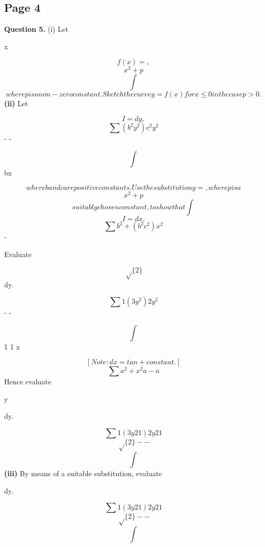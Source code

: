\documentclass[12pt]{article}
\begin{document}
\subsection*{Page 4}
\begin{flushleft}
\bigskip\textbf{Question 5.} (i) Let\par
x\par
\[f(x) = ,\]
\[x^2 + p\]
\[\int\]
\[where p is a non-zero constant. Sketch the curve y = f(x) for x \leq 0 in the case p > 0.\]
\textbf{(ii)} Let\par
\[I = dy,\]
\[\sum (b^2 y^2) c^2 y^2\]
- -\par
\[\int\]
bx\par
\[where b and c are positive constants. Use the substitution y = , where p is a\]
\[x^2 + p\]
\[suitably chosen constant, to show that \int\]
\[I = dx.\]
\[\sum b^2 + (b^2 c^2)x^2\]
-\par
Evaluate\par
\[\sqrt\{2\}\]
dy.\par
\[\sum1 (3 y^2) 2 y^2\]
- -\par
\[\int\]
1 1 x\par
\[[ Note: dx = tan + constant.]\]
\[\sum a^2 + x^2 a - a\]
Hence evaluate\par
y\par
dy.\par
\[\sum 1 (3y2 1) 2y2 1\]
\[\sqrt\{2\} - -\]
\[\int\]
\textbf{(iii)} By means of a suitable substitution, evaluate\par
dy.\par
\[\sum 1 (3y2 1) 2y2 1\]
\[\sqrt\{2\} - -\]
\[\int\]
\end{flushleft}
\end{document}
